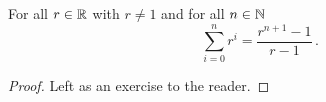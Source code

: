 \guard



\begin{prop}
\label{prop:sumOfGeometricSequence}
  For all $r\in\mathbb{R}$ with $r\not=1$ and for all $n\in\mathbb{N}$
  \[ \sum_{i=0}^n r^i = \frac{r^{n+1}-1}{r-1} \,.\]
\end{prop}
\begin{proof}
  Left as an exercise to the reader.
\end{proof}
